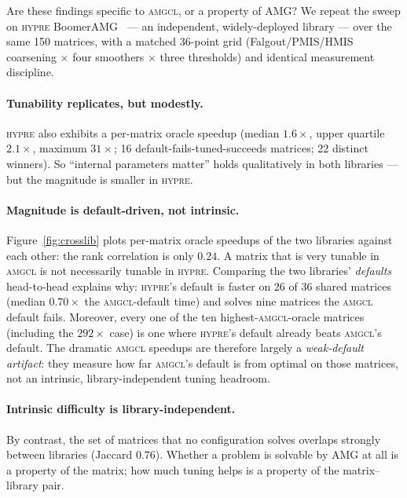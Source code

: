 \documentclass[acmsmall,screen,review]{acmart}
\newcommand{\amgcl}{\textsc{amgcl}}
\newcommand{\hypre}{\textsc{hypre}}
\begin{document}
Are these findings specific to \amgcl{}, or a property of AMG? We repeat the
sweep on \hypre{} BoomerAMG~\cite{henson2002} --- an independent,
widely-deployed library --- over the same 150 matrices, with a matched 36-point
grid (Falgout/PMIS/HMIS coarsening $\times$ four smoothers $\times$ three
thresholds) and identical measurement discipline.

\paragraph{Tunability replicates, but modestly.}
\hypre{} also exhibits a per-matrix oracle speedup (median $1.6\times$, upper
quartile $2.1\times$, maximum $31\times$; 16 default-fails-tuned-succeeds
matrices; 22 distinct winners). So ``internal parameters matter'' holds
qualitatively in both libraries --- but the magnitude is smaller in \hypre{}.

\paragraph{Magnitude is default-driven, not intrinsic.}
Figure~\ref{fig:crosslib} plots per-matrix oracle speedups of the two libraries
against each other: the rank correlation is only $0.24$. A matrix that is very
tunable in \amgcl{} is not necessarily tunable in \hypre{}. Comparing the two
libraries' \emph{defaults} head-to-head explains why: \hypre{}'s default is
faster on 26 of 36 shared matrices (median $0.70\times$ the \amgcl{}-default
time) and solves nine matrices the \amgcl{} default fails. Moreover, every one
of the ten highest-\amgcl{}-oracle matrices (including the $292\times$ case) is
one where \hypre{}'s default already beats \amgcl{}'s default. The dramatic
\amgcl{} speedups are therefore largely a \emph{weak-default artifact}: they
measure how far \amgcl{}'s default is from optimal on those matrices, not an
intrinsic, library-independent tuning headroom.

\paragraph{Intrinsic difficulty is library-independent.}
By contrast, the set of matrices that no configuration solves overlaps strongly
between libraries (Jaccard $0.76$). Whether a problem is solvable by AMG at all
is a property of the matrix; how much tuning helps is a property of the
matrix--library pair.
\end{document}
